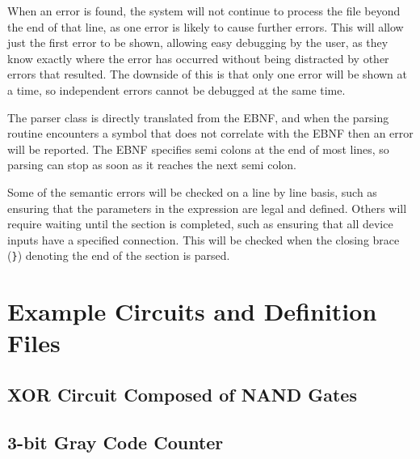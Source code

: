 \documentclass[a4paper,11pt]{article}  %
\begin{document}
When an error is found, the system will not continue to process the
file beyond the end of that line, as one error is likely to cause
further errors. This will allow just the first error to be shown,
allowing easy debugging by the user, as they know exactly where the
error has occurred without being distracted by other errors that
resulted. The downside of this is that only one error will be shown at
a time, so independent errors cannot be debugged at the same time. 

The parser class is directly translated from the EBNF, and when the
parsing routine encounters a symbol that does not correlate with the
EBNF then an error will be reported. The EBNF specifies
semi colons at the end of most lines, so parsing can stop as soon as
it reaches the next semi colon.

Some of the semantic errors will be checked on a line by line basis,
such as ensuring that the parameters in the expression are legal and
defined. Others will require waiting until the section is completed,
such as ensuring that all device inputs have a specified
connection. This will be checked when the closing brace (\verb+}+)
denoting the end of the section is parsed.

\section{Example Circuits and Definition Files}

\subsection{XOR Circuit Composed of NAND Gates}

\subsection{3-bit Gray Code Counter}
\end{document}
